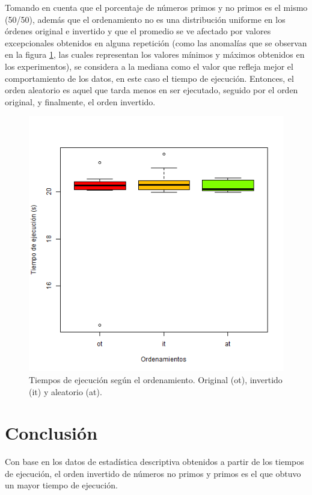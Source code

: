 \documentclass{article}
\begin{document}
Tomando en cuenta que el porcentaje de números primos y no primos es el mismo (50/50), además que el ordenamiento no es una distribución uniforme en los órdenes original e invertido y que el promedio se ve afectado por valores excepcionales obtenidos en alguna repetición (como las anomalías que se observan en la figura \ref{figura1}, las cuales representan los valores mínimos y máximos obtenidos en los experimentos), se considera a la mediana como el valor que refleja mejor el comportamiento de los datos, en este caso el tiempo de ejecución. Entonces, el orden aleatorio es aquel que tarda menos en ser ejecutado, seguido por el orden original, y finalmente, el orden invertido.
\begin{figure}[ptb]
\begin{center}
\includegraphics[width=\linewidth]{p3.png}
\end{center}
\caption{Tiempos de ejecución según el ordenamiento. Original (ot), invertido (it) y aleatorio (at).\label{figura1}}
\end{figure}

\section{Conclusión}
Con base en los datos de estadística descriptiva obtenidos a partir de los tiempos de ejecución, el orden invertido de números no primos y primos es el que obtuvo un mayor tiempo de ejecución. 



\end{document}
